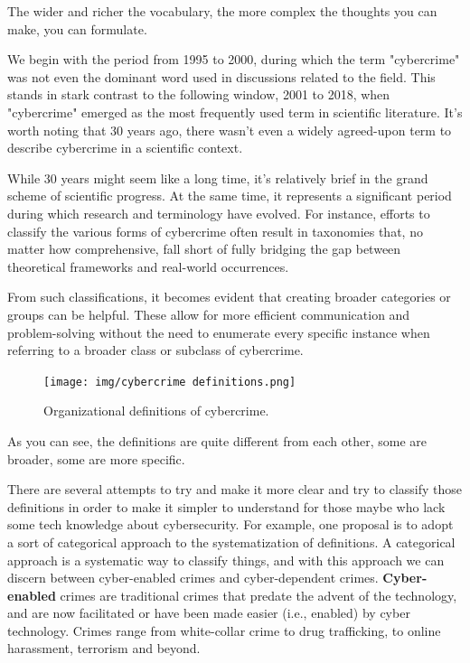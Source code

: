 The wider and richer the vocabulary, the more complex the thoughts you
can make, you can formulate.

We begin with the period from 1995 to 2000, during which the term
"cybercrime" was not even the dominant word used in discussions
related to the field. This stands in stark contrast to the following
window, 2001 to 2018, when "cybercrime" emerged as the most frequently
used term in scientific literature. It’s worth noting that 30 years
ago, there wasn’t even a widely agreed-upon term to describe
cybercrime in a scientific context. 

While 30 years might seem like a long time, it’s relatively brief in
the grand scheme of scientific progress. At the same time, it
represents a significant period during which research and terminology
have evolved. For instance, efforts to classify the various forms of
cybercrime often result in taxonomies that, no matter how
comprehensive, fall short of fully bridging the gap between
theoretical frameworks and real-world occurrences.

From such classifications, it becomes evident that creating broader
categories or groups can be helpful. These allow for more efficient
communication and problem-solving without the need to enumerate every
specific instance when referring to a broader class or subclass of
cybercrime.

\begin{figure}[H]
  \centering
  \texttt{[image: img/cybercrime
  definitions.png]}
  \caption{Organizational definitions of cybercrime.}
\end{figure}

As you can see, the definitions are quite different from each other,
some are broader, some are more specific.

There are several attempts to try and make it more clear and try to
classify those definitions in order to make it simpler to understand
for those maybe who lack some tech knowledge about cybersecurity. For
example, one proposal is to adopt a sort of categorical approach to
the systematization of definitions. A categorical approach is a 
systematic way to classify things, and with this approach we can
discern between cyber-enabled crimes and cyber-dependent crimes. 
\textbf{Cyber-enabled} crimes are traditional crimes that predate the
advent of the technology, and are now facilitated or have been made
easier (i.e., enabled) by cyber technology. Crimes range from
white-collar crime to drug trafficking, to online harassment,
terrorism and beyond.

